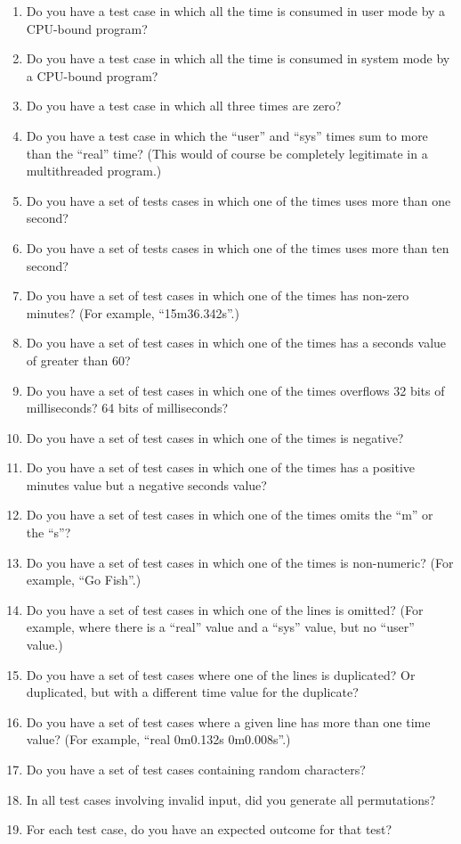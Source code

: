 	\begin{enumerate}
	\item	Do you have a test case in which all the time is
		consumed in user mode by a CPU-bound program?
	\item	Do you have a test case in which all the time is
		consumed in system mode by a CPU-bound program?
	\item	Do you have a test case in which all three times
		are zero?
	\item	Do you have a test case in which the ``user'' and ``sys''
		times sum to more than the ``real'' time?
		(This would of course be completely legitimate in
		a multithreaded program.)
	\item	Do you have a set of tests cases in which one of the
		times uses more than one second?
	\item	Do you have a set of tests cases in which one of the
		times uses more than ten second?
	\item	Do you have a set of test cases in which one of the
		times has non-zero minutes?  (For example, ``15m36.342s''.)
	\item	Do you have a set of test cases in which one of the
		times has a seconds value of greater than 60?
	\item	Do you have a set of test cases in which one of the
		times overflows 32 bits of milliseconds?  64 bits of
		milliseconds?
	\item	Do you have a set of test cases in which one of the
		times is negative?
	\item	Do you have a set of test cases in which one of the
		times has a positive minutes value but a negative
		seconds value?
	\item	Do you have a set of test cases in which one of the
		times omits the ``m'' or the ``s''?
	\item	Do you have a set of test cases in which one of the
		times is non-numeric?  (For example, ``Go Fish''.)
	\item	Do you have a set of test cases in which one of the
		lines is omitted?  (For example, where there is a
		``real'' value and a ``sys'' value, but no ``user''
		value.)
	\item	Do you have a set of test cases where one of the
		lines is duplicated?  Or duplicated, but with a
		different time value for the duplicate?
	\item	Do you have a set of test cases where a given line
		has more than one time value?  (For example,
		``real 0m0.132s 0m0.008s''.)
	\item	Do you have a set of test cases containing random
		characters?
	\item	In all test cases involving invalid input, did you
		generate all permutations?
	\item	For each test case, do you have an expected outcome
		for that test?
	\end{enumerate}

